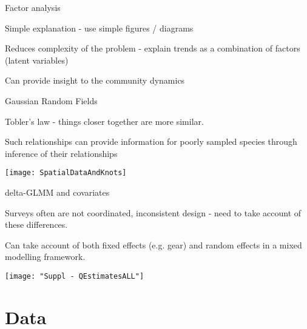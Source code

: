 \documentclass[xcolor=x11names,compress]{beamer}
\renewcommand{\(}{\begin{columns}}
\renewcommand{\)}{\end{columns}}
\newcommand{\<}[1]{\begin{column}{#1}}
\renewcommand{\>}{\end{column}}
\begin{document}
\begin{frame}{Factor analysis}

	Simple explanation - use simple figures / diagrams
	
	Reduces complexity of the problem - explain trends as a combination of
	factors (latent variables)

	Can provide insight to the community dynamics

	
\end{frame}

\begin{frame}{Gaussian Random Fields}

	Tobler's law - things closer together are more similar.

	Such relationships can provide information for poorly sampled species
	through inference of their relationships

\centering
\texttt{[image: SpatialDataAndKnots]}

\end{frame}

\begin{frame}{delta-GLMM and covariates}

Surveys often are not coordinated, inconsistent design - need to take account
of these differences.

Can take account of both fixed effects (e.g. gear) and random effects in a
mixed modelling framework.

\centering
\texttt{[image: "Suppl - QEstimatesALL"]}

	
\end{frame}


\section{Data}
\end{document}
